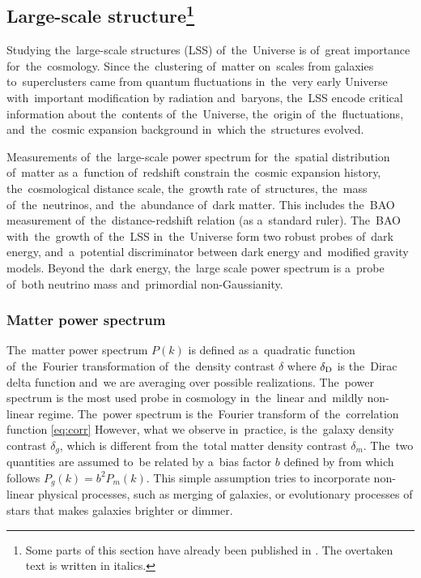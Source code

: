 \subsection[Large-scale structure]{Large-scale structure\footnote{Some parts of this section have already been published in \textcite{mastersthesis_vrastil}. The overtaken text is written in italics.}}
\label{ssec:lss}
Studying the~large-scale structures (LSS) of~the~Universe is of~great importance for~the~cosmology. Since the~clustering of~matter on~scales from galaxies to~superclusters came from quantum fluctuations in~the~very early Universe with~important modification by radiation and~baryons, the~LSS encode critical information about the~contents of~the~Universe, the~origin of~the~fluctuations, and~the~cosmic expansion background in~which the~structures evolved.

Measurements of~the~large-scale power spectrum for~the~spatial distribution of~matter as a~function of~redshift constrain the~cosmic expansion history, the~cosmological distance scale, the~growth rate of~structures, the~mass of~the~neutrinos, and~the~abundance of~dark matter. This includes the~BAO measurement of~the~distance-redshift relation (as a~standard ruler). The~BAO with~the~growth of~the~LSS in~the~Universe form two robust probes of~dark energy, and~a~potential discriminator between dark energy and~modified gravity models. Beyond the~dark energy, the~large scale power spectrum is a~probe of~both neutrino mass and~primordial non-Gaussianity.
\subsubsection{Matter power spectrum}
The~matter power spectrum $P(k)$ is defined as a~quadratic function of~the~Fourier transformation of~the~density contrast $\delta$ \parencite{2010deto.book.....A}
where $\delta_{\rm D}$ is the~Dirac delta function and~we are averaging over possible realizations. The~power spectrum is the most used probe in cosmology in~the~linear and~mildly non-linear regime. The~power spectrum is the~Fourier transform of~the~correlation function \eqref{eq:corr}
However, what we observe in~practice, is the~galaxy density contrast $\delta_g$, which is different from the~total matter density contrast $\delta_m$. The~two quantities are assumed to~be related by a~bias factor $b$ defined by \parencite{2010deto.book.....A}
from which follows $P_g(k)=b^2P_m(k)$. This simple assumption tries to incorporate non-linear physical processes, such as merging of galaxies, or evolutionary processes of stars that makes galaxies brighter or dimmer.

